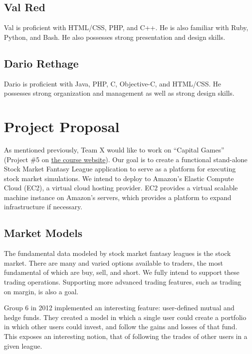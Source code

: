 \documentclass[11pt,letterpaper,oneside]{memoir}
\begin{document}
\section{Val Red}

Val is proficient with HTML/CSS, PHP, and C++. He is also familiar with
Ruby, Python, and Bash. He also possesses strong presentation and design
skills.

\section{Dario Rethage}

Dario is proficient with Java, PHP, C, Objective-C, and HTML/CSS. He
possesses strong organization and management as well as strong design skills.


\chapter{Project Proposal}
\label{proposal}
As mentioned previously, Team X would like to work on ``Capital Games''
(Project \#5 on 
\href{http://ece.rutgers.edu/~marsic/books/SE/projects/}{the course website}).
Our goal is to create a functional stand-alone Stock Market Fantasy League application
to serve as a platform for executing stock market simulations. We intend to deploy
to Amazon's Elastic Compute Cloud (EC2), a virtual cloud hosting provider. EC2 provides
a virtual scalable machine instance on Amazon's servers, which provides a platform to 
expand infrastructure if necessary.

\section{Market Models}

The fundamental data modeled by stock market fantasy leagues is the stock market. There
are many and varied options available to traders, the most fundamental of which are
buy, sell, and short. We fully intend to support these trading operations. Supporting 
more advanced trading features, such as trading on margin, is also a goal. 

Group 6 in 2012 implemented an interesting feature: user-defined mutual and hedge funds.
They created a model in which a single user could create a portfolio in which other 
users could invest, and follow the gains and losses of that fund. This exposes an interesting
notion, that of following the trades of other users in a given league. 
\end{document}

